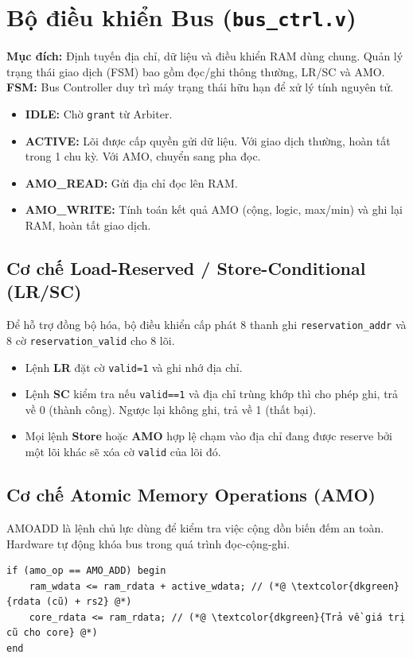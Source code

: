 \section{Bộ điều khiển Bus (\texttt{bus\_ctrl.v})}
\textbf{Mục đích:} Định tuyến địa chỉ, dữ liệu và điều khiển RAM dùng chung. Quản lý trạng thái giao dịch (FSM) bao gồm đọc/ghi thông thường, LR/SC và AMO.
\textbf{FSM:} Bus Controller duy trì máy trạng thái hữu hạn để xử lý tính nguyên tử.
\begin{itemize}
    \item \textbf{IDLE:} Chờ \texttt{grant} từ Arbiter.
    \item \textbf{ACTIVE:} Lõi được cấp quyền gửi dữ liệu. Với giao dịch thường, hoàn tất trong 1 chu kỳ. Với AMO, chuyển sang pha đọc.
    \item \textbf{AMO\_READ:} Gửi địa chỉ đọc lên RAM.
    \item \textbf{AMO\_WRITE:} Tính toán kết quả AMO (cộng, logic, max/min) và ghi lại RAM, hoàn tất giao dịch.
\end{itemize}

\subsection{Cơ chế Load-Reserved / Store-Conditional (LR/SC)}
Để hỗ trợ đồng bộ hóa, bộ điều khiển cấp phát 8 thanh ghi \texttt{reservation\_addr} và 8 cờ \texttt{reservation\_valid} cho 8 lõi.
\begin{itemize}
    \item Lệnh \textbf{LR} đặt cờ \texttt{valid=1} và ghi nhớ địa chỉ.
    \item Lệnh \textbf{SC} kiểm tra nếu \texttt{valid==1} và địa chỉ trùng khớp thì cho phép ghi, trả về 0 (thành công). Ngược lại không ghi, trả về 1 (thất bại).
    \item Mọi lệnh \textbf{Store} hoặc \textbf{AMO} hợp lệ chạm vào địa chỉ đang được reserve bởi một lõi khác sẽ xóa cờ \texttt{valid} của lõi đó.
\end{itemize}

\subsection{Cơ chế Atomic Memory Operations (AMO)}
AMOADD là lệnh chủ lực dùng để kiểm tra việc cộng dồn biến đếm an toàn. Hardware tự động khóa bus trong quá trình đọc-cộng-ghi.
\begin{lstlisting}[caption={Tính toán kết quả AMOADD trong FSM},label={lst:amoadd}]
if (amo_op == AMO_ADD) begin
    ram_wdata <= ram_rdata + active_wdata; // (*@ \textcolor{dkgreen}{rdata (cũ) + rs2} @*)
    core_rdata <= ram_rdata; // (*@ \textcolor{dkgreen}{Trả về giá trị cũ cho core} @*)
end
\end{lstlisting}

